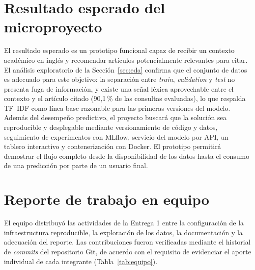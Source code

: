 \documentclass[11pt]{article}
\begin{document}
\section{Resultado esperado del microproyecto}

El resultado esperado es un prototipo funcional capaz de recibir un contexto académico en inglés y recomendar artículos potencialmente relevantes para citar. El análisis exploratorio de la Sección~\ref{sec:eda} confirma que el conjunto de datos es adecuado para este objetivo: la separación entre \textit{train}, \textit{validation} y \textit{test} no presenta fuga de información, y existe una señal léxica aprovechable entre el contexto y el artículo citado (90,1\,\% de las consultas evaluadas), lo que respalda TF--IDF como línea base razonable para las primeras versiones del modelo. Además del desempeño predictivo, el proyecto buscará que la solución sea reproducible y desplegable mediante versionamiento de código y datos, seguimiento de experimentos con MLflow, servicio del modelo por API, un tablero interactivo y contenerización con Docker. El prototipo permitirá demostrar el flujo completo desde la disponibilidad de los datos hasta el consumo de una predicción por parte de un usuario final.

\clearpage
\section{Reporte de trabajo en equipo}

El equipo distribuyó las actividades de la Entrega 1 entre la configuración de la infraestructura reproducible, la exploración de los datos, la documentación y la adecuación del reporte. Las contribuciones fueron verificadas mediante el historial de \textit{commits} del repositorio Git, de acuerdo con el requisito de evidenciar el aporte individual de cada integrante (Tabla~\ref{tab:equipo}).
\end{document}
